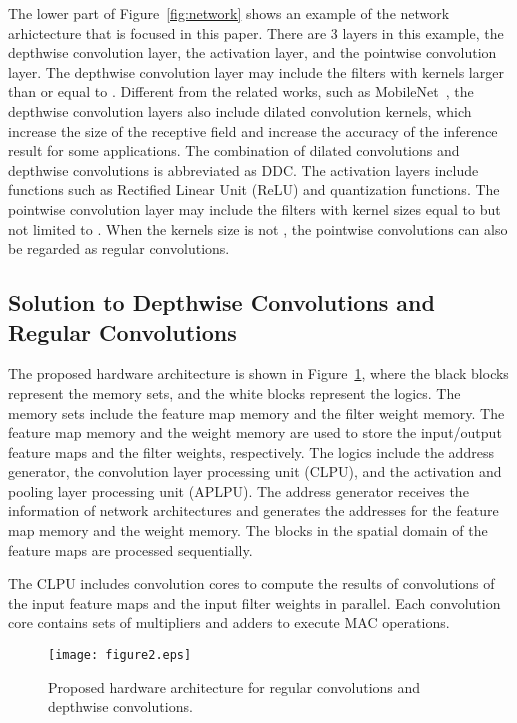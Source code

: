 \documentclass[runningheads]{llncs}
\begin{document}
The lower part of Figure~\ref{fig:network} shows an example of the network arhictecture that is focused in this paper. There are 3 layers in this example, the depthwise convolution layer, the activation layer, and the pointwise convolution layer. The depthwise convolution layer may include the filters with kernels larger than or equal to . Different from the related works, such as MobileNet~\cite{Howard17}, the depthwise convolution layers also include dilated convolution kernels, which increase the size of the receptive field and increase the accuracy of the inference result for some applications. The combination of dilated convolutions and depthwise convolutions is abbreviated as DDC. The activation layers include functions such as Rectified Linear Unit (ReLU) and quantization functions. The pointwise convolution layer may include the filters with kernel sizes equal to  but not limited to . When the kernels size is not , the pointwise convolutions can also be regarded as regular convolutions.

\subsection{Solution to Depthwise Convolutions and Regular Convolutions}
\label{subsec:solution}

The proposed hardware architecture is shown in Figure~\ref{fig:architecture}, where the black blocks represent the memory sets, and the white blocks represent the logics. The memory sets include the feature map memory and the filter weight memory. The feature map memory and the weight memory are used to store the input/output feature maps and the filter weights, respectively. The logics include the address generator, the convolution layer processing unit (CLPU), and the activation and pooling layer processing unit (APLPU). The address generator receives the information of network architectures and generates the addresses for the feature map memory and the weight memory. The blocks in the spatial domain of the feature maps are processed sequentially.

The CLPU includes  convolution cores to compute the results of convolutions of the input feature maps and the input filter weights in parallel. Each convolution core contains  sets of multipliers and adders to execute MAC operations.

\begin{figure}
\centering
\texttt{[image: figure2.eps]}
\caption{Proposed hardware architecture for regular convolutions and depthwise convolutions.}
\label{fig:architecture}
\end{figure}
\end{document}
